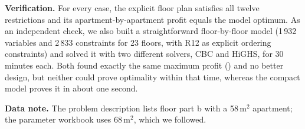 \documentclass[11pt,a4paper]{article}
\begin{document}
\textbf{Verification.} For every case, the explicit floor plan satisfies all
twelve restrictions and its apartment-by-apartment profit equals the model
optimum. As an independent check, we also built a
straightforward floor-by-floor model (1\,932 variables and 2\,833 constraints
for 23 floors, with R12 as explicit ordering constraints) and solved it with two
different solvers, CBC and HiGHS, for 30 minutes each. Both found exactly the
same maximum profit () and no better design, but neither
could prove optimality within that time, whereas the compact model proves it
in about one second.

\textbf{Data note.} The problem description lists floor part b with a
58\,m$^2$ apartment; the parameter workbook uses 68\,m$^2$, which we followed.
\end{document}
